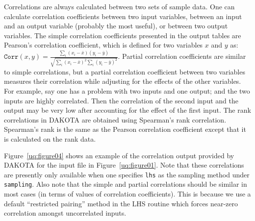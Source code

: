 Correlations are always calculated between two sets of sample data.
One can calculate correlation coefficients between two input
variables, between an input and an output variable (probably the most
useful), or between two output variables.  The simple correlation
coefficients presented in the output tables are Pearson's correlation
coefficient, which is defined for two variables $x$ and $y$ as:
$\mathtt{Corr}(x,y) = \frac{\sum_{i}(x_{i}-\bar{x})(y_{i}-\bar{y})}
{\sqrt{\sum_{i}(x_{i}-\bar{x})^2\sum_{i}(y_{i}-\bar{y})^2}}$.
Partial correlation coefficients are similar to simple correlations,
but a partial correlation coefficient between two variables measures
their correlation while adjusting for the effects of the other
variables.  For example, say one has a problem with two inputs and one
output; and the two inputs are highly correlated.  Then the
correlation of the second input and the output may be very low after
accounting for the effect of the first input.  The rank correlations
in DAKOTA are obtained using Spearman's rank correlation.  Spearman's
rank is the same as the Pearson correlation coefficient except that it
is calculated on the rank data.

Figure~\ref{uq:figure04} shows an example of the correlation output
provided by DAKOTA for the input file in Figure~\ref{uq:figure01}.
Note that these correlations are presently only available when one
specifies \texttt{lhs} as the sampling method under \texttt{sampling}.
Also note that the simple and partial correlations should be similar in most
cases (in terms of values of correlation coefficients).  This is
because we use a default ``restricted pairing'' method in the LHS
routine which forces near-zero correlation amongst uncorrelated
inputs.


